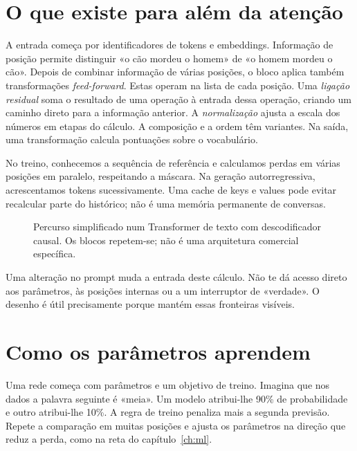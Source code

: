 \section{O que existe para além da atenção}
A entrada começa por identificadores de tokens e embeddings. Informação de posição permite distinguir «o cão mordeu o homem» de «o homem mordeu o cão». Depois de combinar informação de várias posições, o bloco aplica também transformações \emph{feed-forward}. Estas operam na lista de cada posição. Uma \emph{ligação residual} soma o resultado de uma operação à entrada dessa operação, criando um caminho direto para a informação anterior. A \emph{normalização} ajusta a escala dos números em etapas do cálculo. A composição e a ordem têm variantes. Na saída, uma transformação calcula pontuações sobre o vocabulário.

No treino, conhecemos a sequência de referência e calculamos perdas em várias posições em paralelo, respeitando a máscara. Na geração autorregressiva, acrescentamos tokens sucessivamente. Uma cache de keys e values pode evitar recalcular parte do histórico; não é uma memória permanente de conversas.

\begin{figure}[htbp]
\centering
{}
\caption{Percurso simplificado num Transformer de texto com descodificador causal. Os blocos repetem-se; não é uma arquitetura comercial específica.}
\label{fig:transformer}
\end{figure}

Uma alteração no prompt muda a entrada deste cálculo. Não te dá acesso direto aos parâmetros, às posições internas ou a um interruptor de «verdade». O desenho é útil precisamente porque mantém essas fronteiras visíveis.
\section{Como os parâmetros aprendem}
Uma rede começa com parâmetros e um objetivo de treino. Imagina que nos dados a palavra seguinte é «meia». Um modelo atribui-lhe 90\% de probabilidade e outro atribui-lhe 10\%. A regra de treino penaliza mais a segunda previsão. Repete a comparação em muitas posições e ajusta os parâmetros na direção que reduz a perda, como na reta do capítulo~\ref{ch:ml}.

